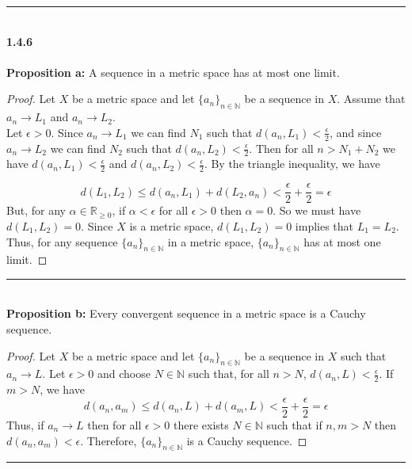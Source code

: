 \documentclass[]{book}
\begin{document}
\noindent\rule{15cm}{0.4pt} \\

{\bf 1.4.6} \\ \\
{\bf Proposition a:} A sequence in a metric space has at most one limit.
\begin{proof}
Let $X$ be a metric space and let $\{a_n\}_{n\in \mathbb{N}}$ be a sequence in $X$. Assume that $a_n\to L_1$ and $a_n\to L_2$. \\
Let $\epsilon>0$. Since $a_n\to L_1$ we can find $N_1$ such that $d(a_n,L_1)<\frac{\epsilon}{2}$, and since $a_n\to L_2$ we can find $N_2$ such that $d(a_n,L_2)<\frac{\epsilon}{2}$. Then for all $n>N_1+N_2$ we have $d(a_n,L_1)<\frac{\epsilon}{2}$ and $d(a_n,L_2)<\frac{\epsilon}{2}$. By the triangle inequality, we have

$$d(L_1,L_2) \leqslant d(a_n,L_1) + d(L_2,a_n) < \frac{\epsilon}{2} + \frac{\epsilon}{2} = \epsilon$$
But, for any $\alpha\in \mathbb{R}_{\geqslant 0}$, if $\alpha < \epsilon$ for all $\epsilon >0$ then $\alpha=0$. So we must have $d(L_1,L_2)=0$. Since $X$ is a metric space, $d(L_1,L_2)=0$ implies that $L_1=L_2$. Thus, for any sequence $\{a_n\}_{n\in \mathbb{N}}$ in a metric space, $\{a_n\}_{n\in \mathbb{N}}$ has at most one limit.
\end{proof}

\noindent\rule{15cm}{0.4pt} \\

{\bf Proposition b:} Every convergent sequence in a metric space is a Cauchy sequence.
\begin{proof}
Let $X$ be a metric space and let $\{a_n\}_{n\in \mathbb{N}}$ be a sequence in $X$ such that $a_n\to L$. Let $\epsilon>0$ and choose $N\in \mathbb{N}$ such that, for all $n>N$, $d(a_n,L)<\frac{\epsilon}{2}$. If $m>N$, we have 
$$d(a_n,a_m) \leqslant d(a_n,L) + d(a_m,L) < \frac{\epsilon}{2} + \frac{\epsilon}{2} = \epsilon$$
Thus, if $a_n\to L$ then for all $\epsilon>0$ there exists $N\in \mathbb{N}$ such that if $n,m>N$ then $d(a_n,a_m)< \epsilon$. Therefore, $\{a_n\}_{n\in \mathbb{N}}$ is a Cauchy sequence.
\end{proof}

\noindent\rule{15cm}{0.4pt} \\
\end{document}
